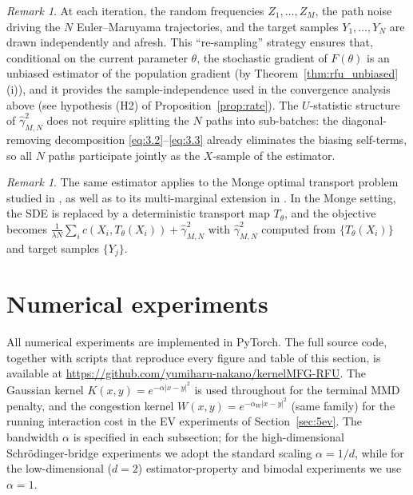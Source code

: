 \documentclass[11pt,leqno]{article}
\theoremstyle{plain}
\theoremstyle{remark}
\newtheorem{rem}[thm]{Remark}
\theoremstyle{definition}
\numberwithin{equation}{section}
\numberwithin{figure}{section}
\numberwithin{table}{section}
\numberwithin{algorithm}{section}
\begin{document}
\begin{rem}\label{rem:3.3}
At each iteration, the random frequencies $Z_1,\ldots,Z_M$, the path noise driving the $N$ Euler--Maruyama trajectories,
and the target samples $Y_1,\ldots,Y_N$ are drawn independently and afresh.
This ``re-sampling'' strategy ensures that, conditional on the current parameter $\theta$,
the stochastic gradient of $F(\theta)$ is an unbiased estimator of the population gradient
(by Theorem~\ref{thm:rfu_unbiased}(i)),
and it provides the sample-independence used in the convergence analysis above
(see hypothesis (H2) of Proposition~\ref{prop:rate}).
The $U$-statistic structure of $\hat{\gamma}_{M,N}^2$ does not require splitting the $N$ paths into sub-batches:
the diagonal-removing decomposition \eqref{eq:3.2}--\eqref{eq:3.3} already eliminates the biasing self-terms,
so all $N$ paths participate jointly as the $X$-sample of the estimator.
\end{rem}

\begin{rem}\label{rem:3.4}
The same estimator applies to the Monge optimal transport problem studied in \cite{sai-nak:2025},
as well as to its multi-marginal extension in \cite{nak-sai:2026}.
In the Monge setting, the SDE is replaced by a deterministic transport map $T_\theta$,
and the objective becomes $\frac{1}{\lambda N}\sum_i c(X_i,T_\theta(X_i)) + \hat{\gamma}_{M,N}^2$
with $\hat{\gamma}_{M,N}^2$ computed from $\{T_\theta(X_i)\}$ and target samples $\{Y_j\}$.
\end{rem}


\section{Numerical experiments}\label{sec:5}

All numerical experiments are implemented in PyTorch.
The full source code, together with scripts that reproduce every figure and table of this section,
is available at \url{https://github.com/yumiharu-nakano/kernelMFG-RFU}.
The Gaussian kernel $K(x,y)=e^{-\alpha|x-y|^2}$ is used throughout for the terminal MMD penalty,
and the congestion kernel $W(x,y)=e^{-\alpha_W|x-y|^2}$ (same family) for the running interaction cost
in the EV experiments of Section~\ref{sec:5ev}.
The bandwidth $\alpha$ is specified in each subsection;
for the high-dimensional Schr{\"o}dinger-bridge experiments we adopt the standard scaling $\alpha=1/d$,
while for the low-dimensional ($d=2$) estimator-property and bimodal experiments we use $\alpha=1$.
\end{document}
